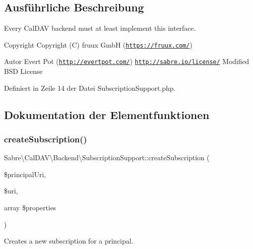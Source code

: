\subsection{Ausführliche Beschreibung}
Every Cal\+D\+AV backend must at least implement this interface.

\begin{DoxyCopyright}{Copyright}
Copyright (C) fruux GmbH (\href{https://fruux.com/}{\tt https\+://fruux.\+com/}) 
\end{DoxyCopyright}
\begin{DoxyAuthor}{Autor}
Evert Pot (\href{http://evertpot.com/}{\tt http\+://evertpot.\+com/})  \href{http://sabre.io/license/}{\tt http\+://sabre.\+io/license/} Modified B\+SD License 
\end{DoxyAuthor}


Definiert in Zeile 14 der Datei Subscription\+Support.\+php.



\subsection{Dokumentation der Elementfunktionen}
\mbox{\label{interface_sabre_1_1_cal_d_a_v_1_1_backend_1_1_subscription_support_a7dec0655bb91ca14f58aa4f5db4242f7}} 
\subsubsection{\texorpdfstring{create\+Subscription()}{createSubscription()}}
{\footnotesize\ttfamily Sabre\textbackslash{}\+Cal\+D\+A\+V\textbackslash{}\+Backend\textbackslash{}\+Subscription\+Support\+::create\+Subscription (\begin{DoxyParamCaption}\item[{}]{\$principal\+Uri,  }\item[{}]{\$uri,  }\item[{array}]{\$properties }\end{DoxyParamCaption})}

Creates a new subscription for a principal.

